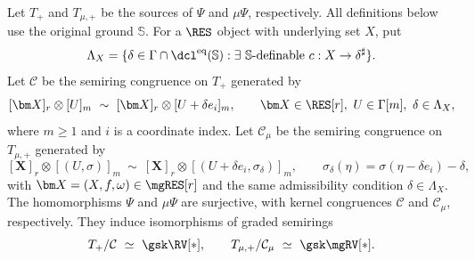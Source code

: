 \begin{prop}\label{red:D:iso}
Let $T_+$ and $T_{\mu,+}$ be the sources of $\Psi$ and ${\mu}\Psi$,
respectively. All definitions below use the original ground $\mathbb S$.
For a $\RES$ object with underlying set $X$, put
\[
 \Lambda_X=\{\delta\in\Gamma\cap\dcl^{\mathrm{eq}}(\mathbb S):
         \exists\ \mathbb S\text{-definable }c:X\to\delta^\sharp\}.
\]
Let $\mathcal C$ be the semiring congruence on $T_+$ generated by
\[
 [\bm X]_r\otimes[U]_m\ \sim\
 [\bm X]_r\otimes[U+\delta e_i]_m,
 \qquad \bm X\in\RES[r],\ U\in\Gamma[m],\ \delta\in\Lambda_X,
\]
where $m\geq1$ and $i$ is a coordinate index. Let $\mathcal C_\mu$
be the semiring congruence on $T_{\mu,+}$ generated by
\[
 [\bm X]_r\otimes[(U,\sigma)]_m\ \sim\
 [\bm X]_r\otimes[(U+\delta e_i,\sigma_\delta)]_m,
 \qquad \sigma_\delta(\eta)=\sigma(\eta-\delta e_i)-\delta,
\]
with $\bm X=(X,f,\omega)\in\mgRES[r]$ and the same admissibility
condition $\delta\in\Lambda_X$.
The homomorphisms $\Psi$ and ${\mu}\Psi$ are surjective, with kernel
congruences $\mathcal C$ and $\mathcal C_\mu$, respectively. They induce
isomorphisms of graded semirings
\[
 T_+/\mathcal C\ \simeq\ \gsk\RV[*],\qquad
 T_{\mu,+}/\mathcal C_\mu\ \simeq\ \gsk\mgRV[*].
\]
\end{prop}
